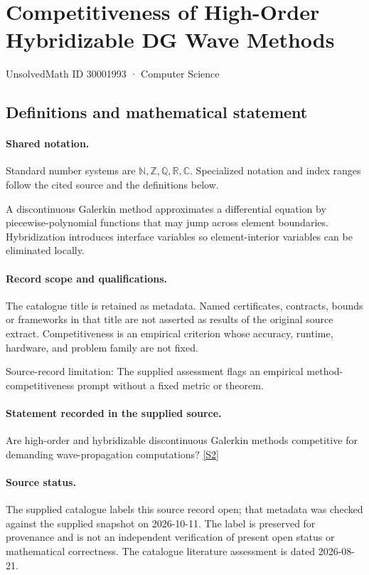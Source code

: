 \documentclass[11pt]{article}
\newcommand{\sref}[2]{\hyperlink{source:#1:#2}{[S#2]}}
\begin{document}
\setcounter{section}{30001992}
\section{Competitiveness of High-Order Hybridizable DG Wave Methods}\label{30001993}
{\small\sffamily UnsolvedMath ID 30001993 · Computer Science}
\subsection{Definitions and mathematical statement}

\paragraph{Shared notation.}Standard number systems are $\mathbb N,\mathbb Z,\mathbb Q,\mathbb R,\mathbb C$. Specialized notation and index ranges follow the cited source and the definitions below.


A discontinuous Galerkin method approximates a differential equation by piecewise-polynomial functions that may jump across element boundaries. Hybridization introduces interface variables so element-interior variables can be eliminated locally.
\paragraph{Record scope and qualifications.}
The catalogue title is retained as metadata. Named certificates, contracts, bounds or frameworks in that title are not asserted as results of the original source extract.
Competitiveness is an empirical criterion whose accuracy, runtime, hardware, and problem family are not fixed.

Source-record limitation: The supplied assessment flags an empirical method-competitiveness prompt without a fixed metric or theorem.
\paragraph{Statement recorded in the supplied source.}
Are high-order and hybridizable discontinuous Galerkin methods competitive for demanding wave-propagation computations? \sref{30001993}{2}
\paragraph{Source status.}
The supplied catalogue labels this source record open; that metadata was checked against the supplied snapshot on 2026-10-11. The label is preserved for provenance and is not an independent verification of present open status or mathematical correctness. The catalogue literature assessment is dated 2026-08-21.
\end{document}
